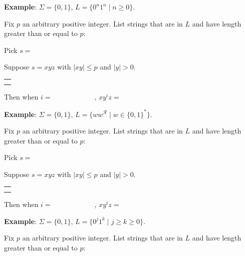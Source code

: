 \documentclass[12pt, oneside]{article}
\begin{document}
\newpage
{\bf Example}: $\Sigma  =  \{0,1\}$, $L = \{ 0^n 1^n \mid n  \geq 0\}$.

Fix $p$ an arbitrary positive integer. List strings that are in $L$ and have length  greater than or equal  to $p$:

\vspace{20pt}

Pick $s = $


Suppose $s = xyz$ with  $|xy|  \leq  p$ and $|y| > 0$.
\begin{center}
\begin{tabular}{|c|}
\hline
 \\
\hspace{4in} \\
\hline
\end{tabular}
\end{center}

Then when $i = \hspace{1in}$, $xy^i z  = \hspace{1in}$

\newpage

{\bf Example}: $\Sigma  =  \{0,1\}$, $L = \{w w^{\mathcal{R}} \mid w \in \{0,1\}^*\}$.

Fix $p$ an arbitrary positive integer. List strings that are in $L$ and have length  greater than or equal  to $p$:

\vspace{10pt}

Pick $s = $

Suppose $s = xyz$ with  $|xy|  \leq  p$ and $|y| > 0$.
\begin{center}
\begin{tabular}{|c|}
\hline
 \\
\hspace{4in} \\
\hline
\end{tabular}
\end{center}
Then when $i = \hspace{1in}$, $xy^i z  = \hspace{1in}$


\vspace{30pt} 

{\bf Example}: $\Sigma  =  \{0,1\}$, $L = \{0^j1^k  \mid j \geq k  \geq 0\}$.

Fix $p$ an arbitrary positive integer. List strings that are in $L$ and have length  greater than or equal  to $p$:

\vspace{10pt}
\end{document}
